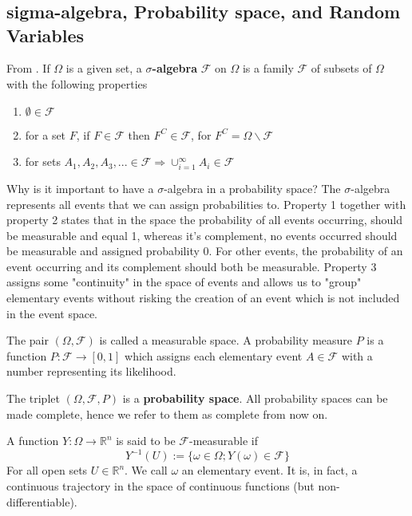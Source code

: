 \documentclass[12pt]{book}
\begin{document}
\tableofcontents
\chapter{}
\section{sigma-algebra, Probability space, and Random Variables}
From \cite{Oksendal14}. If $\Omega$ is a given set, a \textbf{$\sigma$-algebra} $\mathcal{F}$ on $\Omega$ is a family $\mathcal{F}$ of subsets of $\Omega$ with the following properties
\begin{enumerate}
\item $\emptyset \in \mathcal{F}$
\item for a set $F$, if $F\in \mathcal{F}$ then $F^C\in\mathcal{F}$, for $F^C= \Omega\backslash\mathcal{F}$
\item for sets $A_1,A_2,A_3,...\in\mathcal{F}\Rightarrow \cup_{i=1}^\infty A_i \in \mathcal{F}$
\end{enumerate}
Why is it important to have a $\sigma$-algebra in a probability space?
The $\sigma$-algebra represents all events that we can assign probabilities to. Property 1 together with property 2 states that in the space the probability of all events occurring, should be measurable and equal 1, whereas it's complement, no events occurred should be measurable and assigned probability 0. For other events, the probability of an event occurring and its complement should both be measurable. Property 3 assigns some "continuity" in the space of events and allows us to "group" elementary events without risking the creation of an event which is not included in the event space. 

The pair $(\Omega,\mathcal{F})$ is called a measurable space. A probability measure $P$ is a function $P:\mathcal{F}\rightarrow [0,1]$ which assigns each elementary event $A\in\mathcal{F}$ with a number representing its likelihood. 

The triplet $(\Omega,\mathcal{F},P)$ is a \textbf{probability space}. All probability spaces can be made complete, hence we refer to them as complete from now on. 

A function $Y:\Omega\rightarrow\mathbb{R}^n$ is said to be $\mathcal{F}$-measurable if
\begin{equation*}
Y^{-1}(U):=\{\omega\in \Omega ; Y(\omega)\in \mathcal{F}\}
\end{equation*}
For all open sets $U\in\mathbb{R}^n$. We call $\omega$ an elementary event. It is, in fact, a continuous trajectory in the space of continuous functions (but non-differentiable). 
\end{document}
